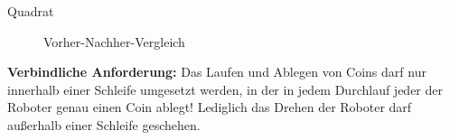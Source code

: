 \documentclass{../preamble}
\begin{document}
\begin{task}[credit = \stars{2}{3}]{Quadrat}
\begin{figure}[h]
        \caption{Vorher-Nachher-Vergleich}
        \label{fig:V5}
    \end{figure}

    \textbf{Verbindliche Anforderung:} Das Laufen und Ablegen von Coins darf nur innerhalb einer Schleife umgesetzt werden, in der in jedem Durchlauf jeder der Roboter genau einen Coin ablegt! Lediglich das Drehen der Roboter darf außerhalb einer Schleife geschehen.

    \clearpage

    \begin{solution}
        
    \end{solution}
\end{task}
\end{document}
